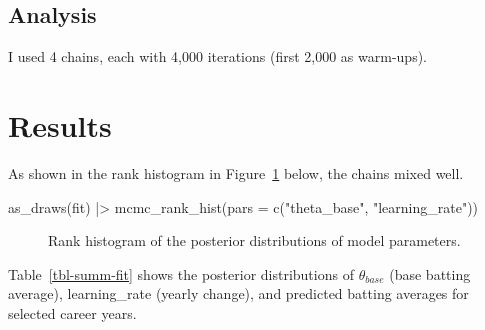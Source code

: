 \documentclass[
  letterpaper,
  DIV=11,
  numbers=noendperiod]{scrartcl}
\newenvironment{Shaded}{\begin{snugshade}}{\end{snugshade}}
\newcommand{\AttributeTok}[1]{\textcolor[rgb]{0.40,0.45,0.13}{#1}}
\newcommand{\FunctionTok}[1]{\textcolor[rgb]{0.28,0.35,0.67}{#1}}
\newcommand{\NormalTok}[1]{\textcolor[rgb]{0.00,0.23,0.31}{#1}}
\newcommand{\SpecialCharTok}[1]{\textcolor[rgb]{0.37,0.37,0.37}{#1}}
\newcommand{\StringTok}[1]{\textcolor[rgb]{0.13,0.47,0.30}{#1}}
\begin{document}
\subsection{Analysis}\label{analysis}

I used 4 chains, each with 4,000 iterations (first 2,000 as warm-ups).

\section{Results}\label{results}

As shown in the rank histogram in Figure~\ref{fig-rank-hist-fit} below,
the chains mixed well.

\begin{Shaded}
\begin{Highlighting}[]
\FunctionTok{as\_draws}\NormalTok{(fit) }\SpecialCharTok{|\textgreater{}}
    \FunctionTok{mcmc\_rank\_hist}\NormalTok{(}\AttributeTok{pars =} \FunctionTok{c}\NormalTok{(}\StringTok{"theta\_base"}\NormalTok{, }\StringTok{"learning\_rate"}\NormalTok{))}
\end{Highlighting}
\end{Shaded}

\begin{figure}[H]


\caption{\label{fig-rank-hist-fit}Rank histogram of the posterior
distributions of model parameters.}

\end{figure}%

Table~\ref{tbl-summ-fit} shows the posterior distributions of
\(\theta_{base}\) (base batting average), learning\_rate (yearly
change), and predicted batting averages for selected career years.
\end{document}
